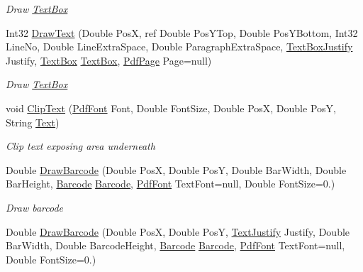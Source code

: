 \begin{DoxyCompactItemize}
\begin{DoxyCompactList}\small\item\em Draw \hyperlink{class_pdf_file_writer_1_1_text_box}{Text\+Box} \end{DoxyCompactList}\item 
Int32 \hyperlink{class_pdf_file_writer_1_1_pdf_contents_a1baa62f3ab8f76b490d64193a9888f71}{Draw\+Text} (Double PosX, ref Double Pos\+Y\+Top, Double Pos\+Y\+Bottom, Int32 Line\+No, Double Line\+Extra\+Space, Double Paragraph\+Extra\+Space, \hyperlink{namespace_pdf_file_writer_acc2474cdbd7c2cbc188a4a852e439459}{Text\+Box\+Justify} Justify, \hyperlink{class_pdf_file_writer_1_1_text_box}{Text\+Box} \hyperlink{class_pdf_file_writer_1_1_text_box}{Text\+Box}, \hyperlink{class_pdf_file_writer_1_1_pdf_page}{Pdf\+Page} Page=null)
\begin{DoxyCompactList}\small\item\em Draw \hyperlink{class_pdf_file_writer_1_1_text_box}{Text\+Box} \end{DoxyCompactList}\item 
void \hyperlink{class_pdf_file_writer_1_1_pdf_contents_a7b74f25c2e4b150f7c4d441e686d66e6}{Clip\+Text} (\hyperlink{class_pdf_file_writer_1_1_pdf_font}{Pdf\+Font} Font, Double Font\+Size, Double PosX, Double PosY, String \hyperlink{namespace_pdf_file_writer_a45e52c090a4d8e1333577773ec0bac4aa9dffbf69ffba8bc38bc4e01abf4b1675}{Text})
\begin{DoxyCompactList}\small\item\em Clip text exposing area underneath \end{DoxyCompactList}\item 
Double \hyperlink{class_pdf_file_writer_1_1_pdf_contents_ab7e072f47b1edd500847a17ca7d1681e}{Draw\+Barcode} (Double PosX, Double PosY, Double Bar\+Width, Double Bar\+Height, \hyperlink{class_pdf_file_writer_1_1_barcode}{Barcode} \hyperlink{class_pdf_file_writer_1_1_barcode}{Barcode}, \hyperlink{class_pdf_file_writer_1_1_pdf_font}{Pdf\+Font} Text\+Font=null, Double Font\+Size=0.)
\begin{DoxyCompactList}\small\item\em Draw barcode \end{DoxyCompactList}\item 
Double \hyperlink{class_pdf_file_writer_1_1_pdf_contents_a58c8c30114109b32ffccb2c316b31eb1}{Draw\+Barcode} (Double PosX, Double PosY, \hyperlink{namespace_pdf_file_writer_a3991bfacc8c7be240452dd24ec817157}{Text\+Justify} Justify, Double Bar\+Width, Double Barcode\+Height, \hyperlink{class_pdf_file_writer_1_1_barcode}{Barcode} \hyperlink{class_pdf_file_writer_1_1_barcode}{Barcode}, \hyperlink{class_pdf_file_writer_1_1_pdf_font}{Pdf\+Font} Text\+Font=null, Double Font\+Size=0.)

\end{DoxyCompactItemize}
